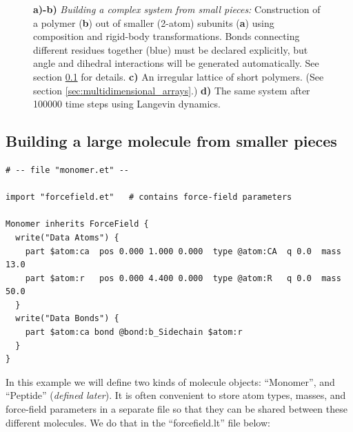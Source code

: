 \documentclass[11pt]{article}
\begin{document}
\begin{figure}[htbp]
\caption{
\label{fig:2bead_peptide}
\textbf{a)-b)}
\textit{Building a complex system from small pieces:}
Construction of a polymer (\textbf{b}) 
out of smaller (2-atom) subunits (\textbf{a})
using composition and rigid-body transformations. 
Bonds connecting different residues together (blue) 
must be declared explicitly, 
but angle and dihedral interactions will be generated automatically.
See section \ref{sec:2bead} for details.
\textbf{c)}
An irregular lattice of short polymers.
(See section \ref{sec:multidimensional_arrays}.)
\textbf{d)}
The same system after 100000 time steps using Langevin dynamics.
}
\end{figure}



\pagebreak

\subsection{Building a large molecule from smaller pieces}
\label{sec:2bead}

\begin{verbatim}
# -- file "monomer.et" --

import "forcefield.et"   # contains force-field parameters

Monomer inherits ForceField {
  write("Data Atoms") {
    part $atom:ca  pos 0.000 1.000 0.000  type @atom:CA  q 0.0  mass 13.0 
    part $atom:r   pos 0.000 4.400 0.000  type @atom:R   q 0.0  mass 50.0
  }
  write("Data Bonds") {
    part $atom:ca bond @bond:b_Sidechain $atom:r
  }
}
\end{verbatim}



In this example we will define two kinds of molecule objects:
``Monomer'', and ``Peptide'' (\textit{defined later}).
It is often convenient to store atom types, masses, and force-field 
parameters in a separate file so that they
can be shared between these different molecules.
We do that in the ``forcefield.lt'' file below:
\end{document}
